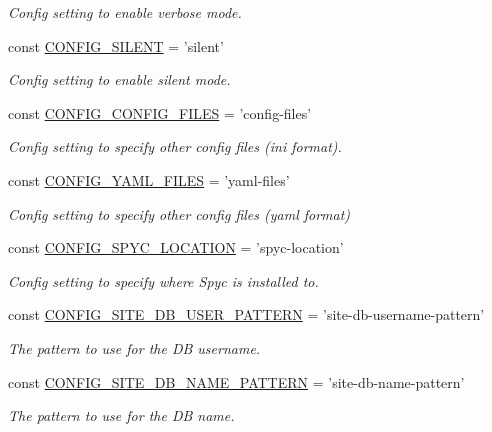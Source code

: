 \begin{DoxyCompactItemize}
\begin{DoxyCompactList}\small\item\em Config setting to enable verbose mode. \end{DoxyCompactList}\item 
const \hyperlink{group__config_gae51e7d020c4c382825abd620db8f406b}{C\-O\-N\-F\-I\-G\-\_\-\-S\-I\-L\-E\-N\-T} = 'silent'
\begin{DoxyCompactList}\small\item\em Config setting to enable silent mode. \end{DoxyCompactList}\item 
const \hyperlink{group__config_gae9bcc12ef43805dccf313d96ba6949ac}{C\-O\-N\-F\-I\-G\-\_\-\-C\-O\-N\-F\-I\-G\-\_\-\-F\-I\-L\-E\-S} = 'config-\/files'
\begin{DoxyCompactList}\small\item\em Config setting to specify other config files (ini format). \end{DoxyCompactList}\item 
const \hyperlink{group__config_gac84613fd7b98146ba56ca2d0ebad83c5}{C\-O\-N\-F\-I\-G\-\_\-\-Y\-A\-M\-L\-\_\-\-F\-I\-L\-E\-S} = 'yaml-\/files'
\begin{DoxyCompactList}\small\item\em Config setting to specify other config files (yaml format) \end{DoxyCompactList}\item 
const \hyperlink{group__config_ga1c9780167f4edef2e4a8688045caeedb}{C\-O\-N\-F\-I\-G\-\_\-\-S\-P\-Y\-C\-\_\-\-L\-O\-C\-A\-T\-I\-O\-N} = 'spyc-\/location'
\begin{DoxyCompactList}\small\item\em Config setting to specify where Spyc is installed to. \end{DoxyCompactList}\item 
const \hyperlink{group__config_ga8319751c1038f4e765582d9d917b84ac}{C\-O\-N\-F\-I\-G\-\_\-\-S\-I\-T\-E\-\_\-\-D\-B\-\_\-\-U\-S\-E\-R\-\_\-\-P\-A\-T\-T\-E\-R\-N} = 'site-\/db-\/username-\/pattern'
\begin{DoxyCompactList}\small\item\em The pattern to use for the D\-B username. \end{DoxyCompactList}\item 
const \hyperlink{group__config_ga956f5da5bf21d8a60c3cedecc94558cc}{C\-O\-N\-F\-I\-G\-\_\-\-S\-I\-T\-E\-\_\-\-D\-B\-\_\-\-N\-A\-M\-E\-\_\-\-P\-A\-T\-T\-E\-R\-N} = 'site-\/db-\/name-\/pattern'
\begin{DoxyCompactList}\small\item\em The pattern to use for the D\-B name. \end{DoxyCompactList}\item 

\end{DoxyCompactItemize}
